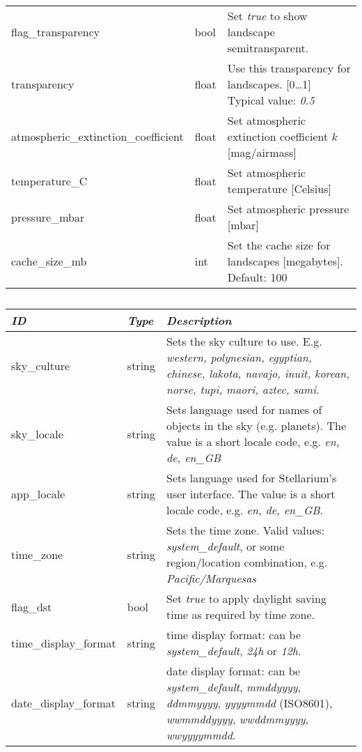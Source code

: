 \begin{longtable}{l|l|p{68mm}}
flag\_transparency                         & bool  & Set \emph{true} to show landscape semitransparent.\\
transparency                               & float & Use this transparency for landscapes. [0\ldots1] Typical value: \emph{0.5}\\
atmospheric\_extinction\_coefficient       & float & Set atmospheric extinction coefficient $k$ [mag/airmass]\\%
temperature\_C                             & float & Set atmospheric temperature [Celsius]\\%
pressure\_mbar                             & float & Set atmospheric pressure [mbar]\\%
cache\_size\_mb                            & int   & Set the cache size for landscapes [megabytes]. Default: 100\\\bottomrule
\end{longtable}

\subsection{}

\begin{tabularx}{\textwidth}{l|l|X}\toprule
\emph{ID}         & \emph{Type} & \emph{Description}\\\midrule
sky\_culture          & string & Sets the sky culture to use. E.g. \emph{western, polynesian, egyptian, chinese, 
                                 lakota, navajo, inuit, korean, norse, tupi, maori, aztec, sami}.\\%
sky\_locale           & string & Sets language used for names of objects in the sky (e.g. planets). 
                                 The value is a short locale code, e.g. \emph{en, de, en\_GB}\\%
app\_locale           & string & Sets language used for Stellarium's user interface. 
                                  The value is a short locale code, e.g. \emph{en, de, en\_GB}.\\%
time\_zone            & string & Sets the time zone. Valid values: \emph{system\_default}, 
                                 or some region/location combination, e.g. \emph{Pacific/Marquesas}\\%
flag\_dst             & bool   & Set \emph{true} to apply daylight saving time as required by time zone.\\
time\_display\_format & string & time display format: can be \emph{system\_default}, \emph{24h} or \emph{12h}.\\%
date\_display\_format & string & date display format: can be \emph{system\_default}, \emph{mmddyyyy}, \emph{ddmmyyyy}, \emph{yyyymmdd} (ISO8601), \emph{wwmmddyyyy}, \emph{wwddmmyyyy}, \emph{wwyyyymmdd}.\\\bottomrule
\end{tabularx}

